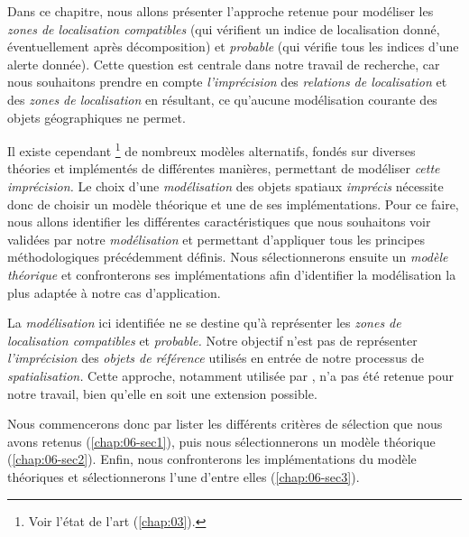 Dans ce chapitre, nous allons présenter l'approche retenue pour
modéliser les \emph{zones de localisation compatibles} (\ie qui
vérifient un indice de localisation donné, éventuellement après
décomposition) et \emph{probable} (qui vérifie tous les indices d'une
alerte donnée). Cette question est centrale dans notre travail de
recherche, car nous souhaitons prendre en compte \emph{l'imprécision}
des \emph{relations de localisation} et des \emph{zones de
  localisation} en résultant, ce qu'aucune modélisation courante des
objets géographiques ne permet.

Il existe cependant \footnote{Voir l'état de l'art
  (\autoref{chap:03}).} de nombreux modèles alternatifs, fondés sur
diverses théories et implémentés de différentes manières, permettant
de modéliser \emph{cette imprécision.} Le choix d'une
\emph{modélisation} des objets spatiaux \emph{imprécis} nécessite donc
de choisir un modèle théorique et une de ses implémentations. Pour ce
faire, nous allons identifier les différentes caractéristiques que
nous souhaitons voir validées par notre \emph{modélisation} et
permettant d'appliquer tous les principes méthodologiques précédemment
définis. Nous sélectionnerons ensuite un \emph{modèle théorique} et
confronterons ses implémentations afin d'identifier la modélisation la
plus adaptée à notre cas d’application.

La \emph{modélisation} ici identifiée ne se destine qu'à représenter
les \emph{zones de localisation compatibles} et \emph{probable.}
Notre objectif n'est pas de représenter \emph{l'imprécision} des
\emph{objets de référence} utilisés en entrée de notre processus de
\emph{spatialisation.} Cette approche, notamment utilisée par
\textcite{Bloch1996}, n'a pas été retenue pour notre travail, bien
qu'elle en soit une extension possible.

Nous commencerons donc par lister les différents critères de sélection
que nous avons retenus (\ref{chap:06-sec1}), puis nous sélectionnerons
un modèle théorique (\ref{chap:06-sec2}). Enfin, nous confronterons
les implémentations du modèle théoriques et sélectionnerons l'une
d'entre elles (\ref{chap:06-sec3}).

